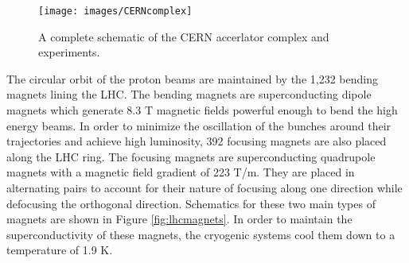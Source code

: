 \begin{figure}[htbp]
  \centering
    \texttt{[image: images/CERNcomplex]}
    \caption[CERN Accelerator Complex]{A complete schematic of the CERN accerlator complex and experiments.\cite{CERNcomplex}}
    \label{fig:CERNcomplex}
\end{figure}

The circular orbit of the proton beams are maintained by the 1,232 bending magnets lining the LHC. The bending magnets are superconducting dipole magnets which generate 8.3 T magnetic fields powerful enough to bend the high energy beams. In order to minimize the oscillation of the bunches around their trajectories and achieve high luminosity, 392 focusing magnets are also placed along the LHC ring. The focusing magnets are superconducting quadrupole magnets with a magnetic field gradient of 223 T/m. They are placed in alternating pairs to account for their nature of focusing along one direction while defocusing the orthogonal direction. Schematics for these two main types of magnets are shown in Figure \ref{fig:lhcmagnets}. In order to maintain the superconductivity of these magnets, the cryogenic systems cool them down to a temperature of 1.9 K.

